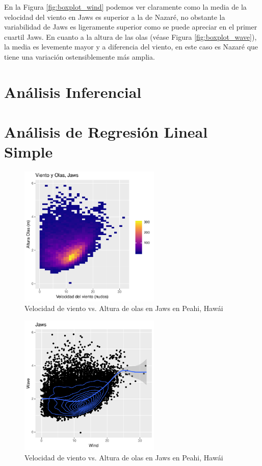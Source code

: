 En la Figura \ref{fig:boxplot_wind} podemos ver claramente como la media de la velocidad del viento en Jaws es superior a la de Nazaré, no obstante la variabilidad de Jaws es ligeramente superior como se puede apreciar en el primer cuartil Jaws. En cuanto a la altura de las olas (véase Figura \ref{fig:boxplot_wave}), la media es levemente mayor y a diferencia del viento, en este caso es Nazaré que tiene una variación ostensiblemente más amplia.

\section{Análisis Inferencial}%
\label{sec:resultados}

\section{Análisis de Regresión Lineal Simple}
\label{sec:rls}



\begin{figure}[H]
\label{fig:wind_waves_jaws}
\centering
\includegraphics[width=0.6\textwidth]{./figures/jaws_bin2d.pdf}
  \caption{Velocidad de viento vs. Altura de olas en Jaws en Peahi, Hawái}
\end{figure}

\begin{figure}[H]
\label{fig:jaws_smooth}
\centering
\includegraphics[width=0.6\textwidth]{./figures/jaws_smooth.pdf}
  \caption{Velocidad de viento vs. Altura de olas en Jaws en Peahi, Hawái}
\end{figure}

